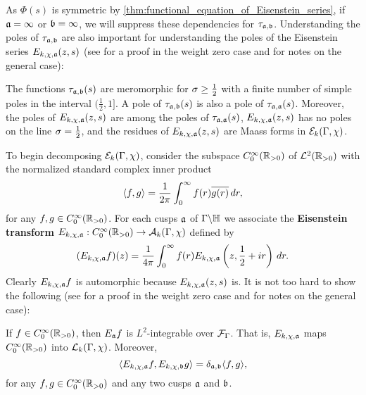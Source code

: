     As $\Phi(s)$ is symmetric by \cref{thm:functional_equation_of_Eisenstein_series}, if $\mathfrak{a} = \infty$ or $\mathfrak{b} = \infty$, we will suppress these dependencies for $\tau_{\mathfrak{a},\mathfrak{b}}$. Understanding the poles of $\tau_{\mathfrak{a},\mathfrak{b}}$ are also important for understanding the poles of the Eisenstein series $E_{k,\chi,\mathfrak{a}}(z,s)$ (see \cite{iwaniec2002spectral} for a proof in the weight zero case and \cite{duke2002subconvexity} for notes on the general case):

    \begin{theorem}\label{thm:residues_of_Eisenstein_series}
      The functions $\tau_{\mathfrak{a},\mathfrak{b}}(s)$ are meromorphic for $\sigma \ge \frac{1}{2}$ with a finite number of simple poles in the interval $(\frac{1}{2},1]$. A pole of $\tau_{\mathfrak{a},\mathfrak{b}}(s)$ is also a pole of $\tau_{\mathfrak{a},\mathfrak{a}}(s)$. Moreover, the poles of $E_{k,\chi,\mathfrak{a}}(z,s)$ are among the poles of $\tau_{\mathfrak{a},\mathfrak{a}}(s)$, $E_{k,\chi,\mathfrak{a}}(z,s)$ has no poles on the line $\sigma = \frac{1}{2}$, and the residues of $E_{k,\chi,\mathfrak{a}}(z,s)$ are Maass forms in $\mathcal{E}_{k}(\Gamma,\chi)$.
    \end{theorem}

    To begin decomposing $\mathcal{E}_{k}(\Gamma,\chi)$, consider the subspace $C_{0}^{\infty}(\mathbb{R}_{> 0})$ of $\mathcal{L}^{2}(\mathbb{R}_{> 0})$ with the normalized standard complex inner product
    \[
      \langle f,g\rangle = \frac{1}{2\pi}\int_{0}^{\infty}f(r)\overline{g(r)}\,dr,
    \]
    for any $f,g \in C_{0}^{\infty}(\mathbb{R}_{> 0})$. For each cusps $\mathfrak{a}$ of $\Gamma\backslash\mathbb{H}$ we associate the \textbf{Eisenstein transform} $E_{k,\chi,\mathfrak{a}}:C_{0}^{\infty}(\mathbb{R}_{> 0}) \to \mathcal{A}_{k}(\Gamma,\chi)$ defined by
    \[
      (E_{k,\chi,\mathfrak{a}}f)(z) = \frac{1}{4\pi}\int_{0}^{\infty}f(r)E_{k,\chi,\mathfrak{a}}\left(z,\frac{1}{2}+ir\right)\,dr.
    \]
    Clearly $E_{k,\chi,\mathfrak{a}}f$ is automorphic because $E_{k,\chi,\mathfrak{a}}(z,s)$ is. It is not too hard to show the following (see \cite{iwaniec2002spectral} for a proof in the weight zero case and \cite{duke2002subconvexity} for notes on the general case):

    \begin{proposition}\label{prop:Eisenstein_transform_property}
      If $f \in C_{0}^{\infty}(\mathbb{R}_{> 0})$, then $E_{\mathfrak{a}}f$ is $L^{2}$-integrable over $\mathcal{F}_{\Gamma}$. That is, $E_{k,\chi,\mathfrak{a}}$ maps $C_{0}^{\infty}(\mathbb{R}_{> 0})$ into $\mathcal{L}_{k}(\Gamma,\chi)$. Moreover,
      \[
        \langle E_{k,\chi,\mathfrak{a}}f,E_{k,\chi,\mathfrak{b}}g\rangle = \delta_{\mathfrak{a},\mathfrak{b}}\langle f,g\rangle,
      \]
      for any $f,g \in C_{0}^{\infty}(\mathbb{R}_{> 0})$ and any two cusps $\mathfrak{a}$ and $\mathfrak{b}$.
    \end{proposition}

